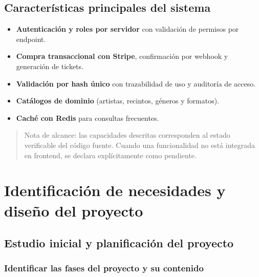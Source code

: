 \documentclass[
  11pt,
  a4paper,
  twoside=false,
  parskip=half               %
]{scrreprt}                  %
\providecommand{\tightlist}{%
  \setlength{\itemsep}{0pt}\setlength{\parskip}{0pt}}
\begin{document}
\hypertarget{caracteruxedsticas-principales-del-sistema}{%
\section{Características principales del
sistema}\label{caracteruxedsticas-principales-del-sistema}}

\begin{itemize}
\tightlist
\item
  \textbf{Autenticación y roles por servidor} con validación de permisos
  por endpoint.
\item
  \textbf{Compra transaccional con Stripe}, confirmación por webhook y
  generación de tickets.
\item
  \textbf{Validación por hash único} con trazabilidad de uso y auditoría
  de acceso.
\item
  \textbf{Catálogos de dominio} (artistas, recintos, géneros y
  formatos).
\item
  \textbf{Caché con Redis} para consultas frecuentes.
\end{itemize}

\begin{quote}
Nota de alcance: las capacidades descritas corresponden al estado
verificable del código fuente. Cuando una funcionalidad no está
integrada en frontend, se declara explícitamente como pendiente.
\end{quote}

\hypertarget{identificaciuxf3n-de-necesidades-y-diseuxf1o-del-proyecto}{%
\chapter{Identificación de necesidades y diseño del
proyecto}\label{identificaciuxf3n-de-necesidades-y-diseuxf1o-del-proyecto}}

\hypertarget{estudio-inicial-y-planificaciuxf3n-del-proyecto}{%
\section{Estudio inicial y planificación del
proyecto}\label{estudio-inicial-y-planificaciuxf3n-del-proyecto}}

\hypertarget{identificar-las-fases-del-proyecto-y-su-contenido}{%
\subsection{Identificar las fases del proyecto y su
contenido}\label{identificar-las-fases-del-proyecto-y-su-contenido}}
\end{document}
